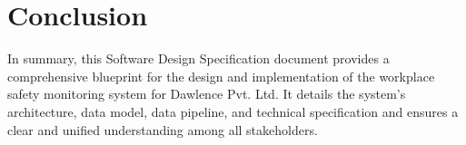 \documentclass[12pt]{article}
\begin{document}
\newpage
\section{Conclusion}
In summary, this Software Design Specification document provides a comprehensive blueprint for the design and implementation of the workplace safety monitoring system for Dawlence Pvt. Ltd. It details  the system's architecture, data model, data pipeline, and technical specification and ensures a clear and unified understanding among all stakeholders.
\end{document}
